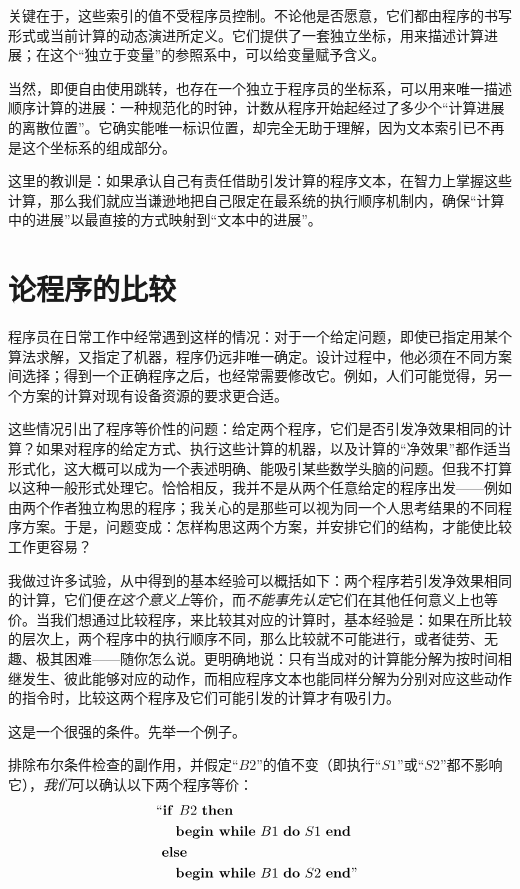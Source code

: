 关键在于，这些索引的值不受程序员控制。不论他是否愿意，它们都由程序的书写形式或当前计算的动态演进所定义。它们提供了一套独立坐标，用来描述计算进展；在这个“独立于变量”的参照系中，可以给变量赋予含义。

当然，即便自由使用跳转，也存在一个独立于程序员的坐标系，可以用来唯一描述顺序计算的进展：一种规范化的时钟，计数从程序开始起经过了多少个“计算进展的离散位置”。它确实能唯一标识位置，却完全无助于理解，因为文本索引已不再是这个坐标系的组成部分。

这里的教训是：如果承认自己有责任借助引发计算的程序文本，在智力上掌握这些计算，那么我们就应当谦逊地把自己限定在最系统的执行顺序机制内，确保“计算中的进展”以最直接的方式映射到“文本中的进展”。

\section[论程序的比较]{论程序的比较}
\label{sec:comparing-programs}

程序员在日常工作中经常遇到这样的情况：对于一个给定问题，即使已指定用某个算法求解，又指定了机器，程序仍远非唯一确定。设计过程中，他必须在不同方案间选择；得到一个正确程序之后，也经常需要修改它。例如，人们可能觉得，另一个方案的计算对现有设备资源的要求更合适。

这些情况引出了程序等价性的问题：给定两个程序，它们是否引发净效果相同的计算？如果对程序的给定方式、执行这些计算的机器，以及计算的“净效果”都作适当形式化，这大概可以成为一个表述明确、能吸引某些数学头脑的问题。但我不打算以这种一般形式处理它。恰恰相反，我并不是从两个任意给定的程序出发——例如由两个作者独立构思的程序；我关心的是那些可以视为同一个人思考结果的不同程序方案。于是，问题变成：怎样构思这两个方案，并安排它们的结构，才能使比较工作更容易？

我做过许多试验，从中得到的基本经验可以概括如下：两个程序若引发净效果相同的计算，它们便\textit{在这个意义上}等价，而\textit{不能事先认定}它们在其他任何意义上也等价。当我们想通过比较程序，来比较其对应的计算时，基本经验是：如果在所比较的层次上，两个程序中的执行顺序不同，那么比较就不可能进行，或者徒劳、无趣、极其困难——随你怎么说。更明确地说：只有当成对的计算能分解为按时间相继发生、彼此能够对应的动作，而相应程序文本也能同样分解为分别对应这些动作的指令时，比较这两个程序及它们可能引发的计算才有吸引力。

这是一个很强的条件。先举一个例子。

排除布尔条件检查的副作用，并假定“$B2$”的值不变（即执行“$S1$”或“$S2$”都不影响它），\textit{我们}可以确认以下两个程序等价：
\begin{equation}
	\label{eq:comparing-example-1}
	\begin{split}
	&\text{\hspace{-.4em}``\textbf{if }} B2\text{ \textbf{then}}\\
	&\quad \text{\textbf{begin while} } B1\text{ \textbf{do} } S1 \text{ \textbf{end}}\\
	&\text{\textbf{else}}\\
	&\quad \text{\textbf{begin while} } B1\text{ \textbf{do} } S2\text{ \textbf{end}''}
	\end{split}
\end{equation}

